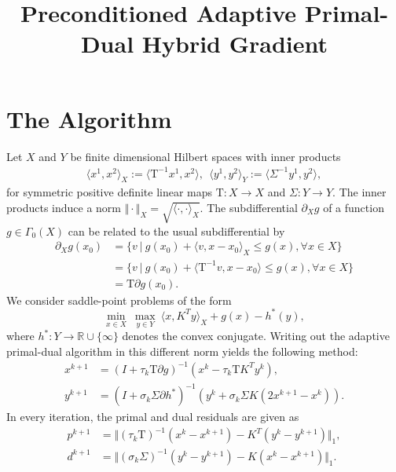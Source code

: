 \documentclass[A4,12pt]{article}
\title{Preconditioned Adaptive Primal-Dual Hybrid Gradient}
\date{}
\newcommand{\bbRext}{\mathbb{R} \cup \{ \infty \} }
\newcommand{\rslv}[1]{(I + #1)^{-1}}
\newcommand{\norm}[1]{\Vert #1 \Vert}
\providecommand{\iprod}[2]{\langle#1,#2\rangle}
\newcommand{\Tau}{\mathrm{T}}
\begin{document}
\maketitle

\section{The Algorithm}
Let $X$ and $Y$ be finite dimensional Hilbert spaces with inner products
\begin{equation}
  \begin{aligned}
    \iprod{x^1}{x^2}_X := \iprod{\Tau^{-1} x^1}{x^2}, ~~
    \iprod{y^1}{y^2}_Y := \iprod{\Sigma^{-1} y^1}{y^2},
  \end{aligned}
\end{equation}
for symmetric positive definite linear maps $\Tau : X \rightarrow X$ and $\Sigma : Y \rightarrow Y$. The inner products induce a norm $\norm{\cdot}_X = \sqrt{\iprod{\cdot}{\cdot}_X}$. The subdifferential $\partial_X g$ of a function $g \in \Gamma_0(X)$ can be related to the usual subdifferential by 
\begin{equation}
  \begin{aligned}
    \partial_X g(x_0) &= \{ v ~|~ g(x_0) + \iprod{v}{x - x_0}_X \leq g(x), \forall x \in X\}\\
&=  \{ v ~|~ g(x_0) + \iprod{\Tau^{-1}v}{x - x_0} \leq g(x), \forall x \in X\} \\
&= \Tau \partial g(x_0).
  \end{aligned}
\end{equation}
We consider saddle-point problems of the form
\begin{equation}
  \underset{x \in X} \min ~ \underset{y \in Y} \max ~ \iprod{x}{K^T y}_X + g(x) - h^*(y),
\end{equation}
where $h^* : Y \rightarrow \bbRext$ denotes the convex conjugate. Writing out the adaptive primal-dual algorithm in this different norm yields the following method:
\begin{equation} 
  \begin{aligned}
    x^{k+1} &= \rslv{\tau_k \Tau \partial g}(x^k - \tau_k \Tau K^T y^k),\\
    y^{k+1} &= \rslv{\sigma_k \Sigma \partial h^*}(y^k + \sigma_k \Sigma K (2x^{k+1} - x^k)).
  \end{aligned}
\end{equation}
In every iteration, the primal and dual residuals are given as
\begin{equation} 
  \begin{aligned}
    p^{k+1} &= \norm{ (\tau_k \Tau)^{-1} (x^k - x^{k+1}) - K^T (y^k - y^{k+1})}_1,\\
    d^{k+1} &= \norm{ (\sigma_k \Sigma)^{-1} (y^k - y^{k+1}) - K (x^k - x^{k+1})}_1.
  \end{aligned}
\end{equation}
\end{document}
